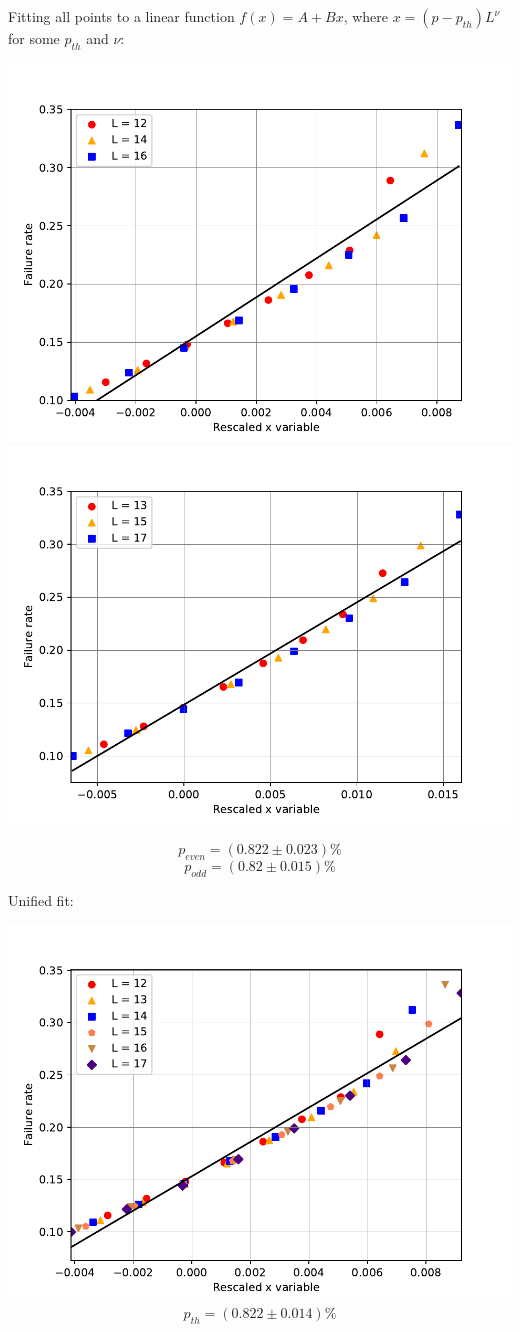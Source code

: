 \documentclass[pra]{revtex4-1}
\begin{document}
\noindent Fitting all points to a linear function $f(x) = A + Bx$, where $x=(p-p_{th})L^{\nu}$ for some $p_{th}$ and $\nu$: 
  
\includegraphics[width=.49\textwidth]{../graphs-paper2/cds-dephasing-even-rescaled.pdf}
\includegraphics[width=.49\textwidth]{../graphs-paper2/cds-dephasing-odd-rescaled.pdf}

\[  p_{even} = (0.822 \pm 0.023)\% \]
\[  p_{odd} = (0.82 \pm 0.015)\% \]
\clearpage 

Unified fit: \begin{center} 

\includegraphics[width=.9\textwidth]{../graphs-paper2/cds-dephasing-rescaled.pdf}
\[  p_{th} = (0.822 \pm 0.014)\% \] \end{center}
\clearpage 
\end{document}
